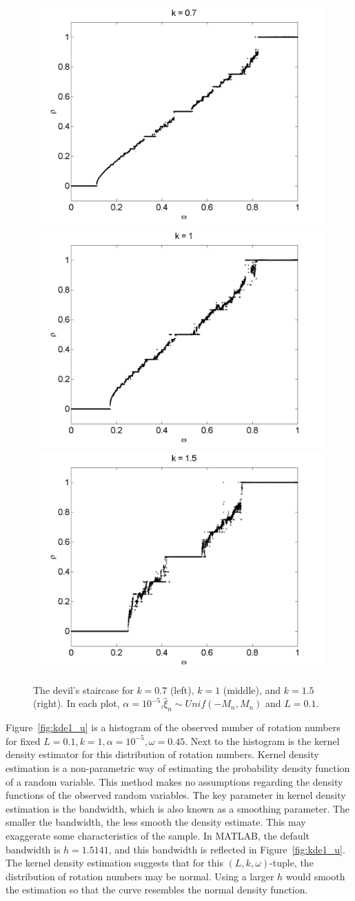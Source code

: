\begin{figure}[H]\linespread{1}
\caption[The devil's staircase for the random circle map, varying $k$
(uniform distribution), $\alpha = 10^{-5}$]{The devil's
  staircase for $k=0.7$ (left), $k=1$ (middle), and $k=1.5$
  (right). In each plot, $\alpha = 10^{-5}$,$\hat{\xi}_n\sim Unif(-M_n,M_n)$ and $L = 0.1$.}\label{fig:randdevil2_u}
\centering
\includegraphics[width=.329\textwidth]{figs/rcirc_u_devil_k07_L01.png}\hfill
\includegraphics[width=.329\textwidth]{figs/rcirc_u_devil_k1_L01.png}\hfill
\includegraphics[width=.329\textwidth]{figs/rcirc_u_devil_k15_L01.png}
\end{figure}

Figure~\ref{fig:kde1_u} is a histogram of the observed number of
rotation numbers for fixed $L=0.1,k=1,\alpha=10^{-5},\omega=0.45$. Next to the
histogram is the kernel density estimator for this distribution of
rotation numbers. Kernel density estimation is a non-parametric way of
estimating the probability density function of a random variable. This
method makes no assumptions regarding the density functions of the
observed random variables. The key parameter in kernel density
estimation is the bandwidth, which is also known as a smoothing
parameter. The smaller the bandwidth, the less smooth the density
estimate. This may exaggerate some characteristics of the sample. In
MATLAB, the default bandwidth is $h=1.5141$, and this bandwidth is reflected
in Figure~\ref{fig:kde1_u}. The kernel density estimation suggests
that for this $(L,k,\omega)$-tuple, the distribution of rotation numbers may be
normal. Using a larger $h$ would smooth the estimation so that the
curve resembles the normal density function. 


